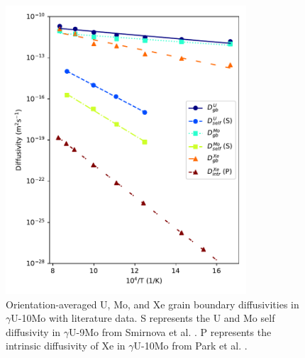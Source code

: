 \documentclass{elsarticle}
\begin{document}
\begin{figure}[!ht]
\centering
\includegraphics[width=0.80\textwidth]{comparison4.pdf}
\caption{Orientation-averaged U, Mo, and Xe grain boundary diffusivities in $\gamma$U-10Mo with literature data. S represents the U and Mo self diffusivity in $\gamma$U-9Mo from Smirnova et al. \cite{smirnova2015}. P represents the intrinsic diffusivity of Xe in $\gamma$U-10Mo from Park et al. \cite{park2023}.}
\label{fig:umoxe}
\end{figure}
\end{document}
